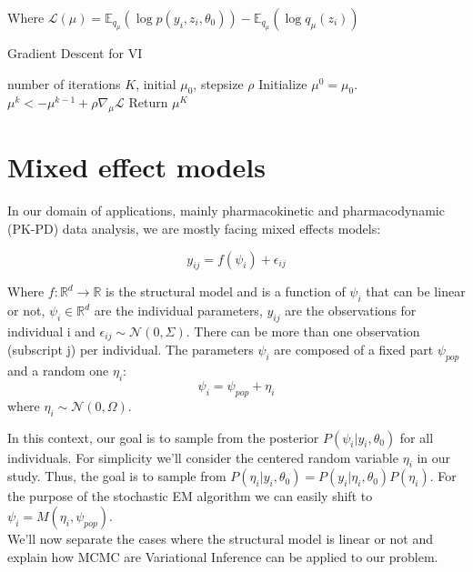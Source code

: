 \documentclass{article}
\begin{document}
Where $\mathcal{L}(\mu) = \mathbb{E}_{q_{\mu}}(\log p(y_i,z_i,\theta_0)) - \mathbb{E}_{q_{\mu}}(\log q_{\mu}(z_i))$

\begin{algorithm}[h]
   \caption{Gradient Descent for VI}
   \label{alg:VI}
\begin{algorithmic}
    number of iterations $K$, initial $\mu_0$, stepsize $\rho$
	\STATE Initialize $\mu^0 = \mu_0$.
   \STATE $\mu^k <- \mu^{k-1} + \rho \nabla_{\mu} \mathcal{L}$
   \ENDFOR
	\STATE Return $\mu^K$
\end{algorithmic}
\end{algorithm}


\section{Mixed effect models} 

In our domain of applications, mainly pharmacokinetic and pharmacodynamic (PK-PD) data analysis, we are mostly facing mixed effects models:

\begin{equation}
y_{ij} = f(\psi_i) + \epsilon_{ij}
\end{equation}

Where $f: \mathbb{R}^d \to \mathbb{R}$ is the structural model and is a function of $\psi_i$ that can be linear or not, $\psi_i \in \mathbb{R}^d$ are the individual parameters, $y_{ij}$ are the observations for individual i and $\epsilon_{ij} \sim \mathcal{N}(0,\Sigma)$. There can be more than one observation (subscript j) per individual. The parameters $\psi_i$ are composed of a fixed part $\psi_{pop}$ and a random one $\eta_i$:
\begin{equation}
\psi_i = \psi_{pop} + \eta_i 
\end{equation}
where $\eta_i \sim \mathcal{N}(0,\Omega)$.

In this context, our goal is to sample from the posterior $P(\psi_i|y_i,\theta_0)$ for all individuals. For simplicity we'll consider the centered random variable $\eta_i$ in our study. Thus, the goal is to sample from $P(\eta_i|y_i,\theta_0) = P(y_i|\eta_i,\theta_0)P(\eta_i)$. For the purpose of the stochastic EM algorithm we can easily shift to $\psi_i = M(\eta_i, \psi_{pop})$.\\
We'll now separate the cases where the structural model is linear or not and explain how MCMC are Variational Inference can be applied to our problem.
\end{document}
